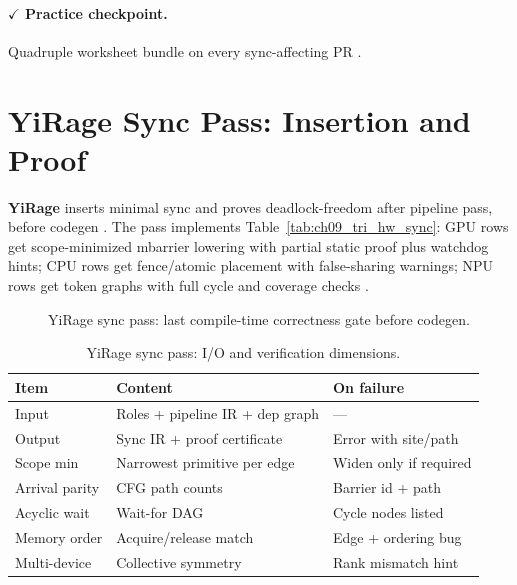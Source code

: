 \paragraph{$\checkmark$ Practice checkpoint.}
Quadruple worksheet bundle on every sync-affecting PR \citep{chen2020compilerbasedhardw,taxbreak2026}.

\section{YiRage Sync Pass: Insertion and Proof}
\label{sec:ch09_yirage_sync_pass}

\textbf{YiRage} inserts minimal sync and proves deadlock-freedom after pipeline pass, before codegen \citep{yirage2026,shah2024flashattention3,wu2024mirage,mpk2025}.
The pass implements Table~\ref{tab:ch09_tri_hw_sync}: GPU rows get scope-minimized mbarrier lowering with partial static proof plus watchdog hints; CPU rows get fence/atomic placement with false-sharing warnings; NPU rows get token graphs with full cycle and coverage checks \citep{amd2024xdna,chen2020compilerbasedhardw,patel2025llminference}.

\begin{figure}[t]
\centering
{}
\caption{YiRage sync pass: last compile-time correctness gate before codegen.}
\label{fig:ch09_yirage_sync_pass}
\end{figure}

\begin{table}[t]
\centering
\small
\caption{YiRage sync pass: I/O and verification dimensions.}
\label{tab:ch09_sync_pass_io}
\begin{tabular}{@{}p{2.2cm}p{4.8cm}p{2.4cm}@{}}
\toprule
\textbf{Item} & \textbf{Content} & \textbf{On failure} \\
\midrule
Input & Roles + pipeline IR + dep graph & --- \\
Output & Sync IR + proof certificate & Error with site/path \\
Scope min & Narrowest primitive per edge & Widen only if required \\
Arrival parity & CFG path counts & Barrier id + path \\
Acyclic wait & Wait-for DAG & Cycle nodes listed \\
Memory order & Acquire/release match & Edge + ordering bug \\
Multi-device & Collective symmetry & Rank mismatch hint \\
\bottomrule
\end{tabular}
\end{table}

